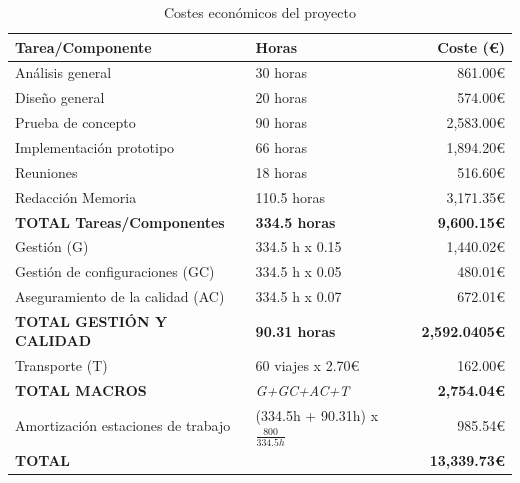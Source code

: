 \begin{table}[!h]
\centering
\bgroup
\def\arraystretch{1.3}
\begin{tabular}{l p{120pt} r}
\toprule
\textbf{Tarea/Componente} & \textbf{Horas} & \textbf{Coste (€)} \\
 \midrule
 Análisis general
& 
30 horas
& 
861.00€
 \\
 Diseño general
& 
20 horas
& 
574.00€
 \\
 Prueba de concepto
& 
90 horas
& 
2,583.00€
 \\
 Implementación prototipo
& 
66 horas
&
1,894.20€
 \\
 Reuniones
& 
18 horas
& 
516.60€
 \\
 Redacción Memoria
& 
110.5 horas
& 
3,171.35€
 \\
 \textbf{TOTAL Tareas/Componentes}
& 
\textbf{334.5 horas}
& 
\textbf{9,600.15€}
 \\
 \hline
 Gestión (G)
& 
334.5 h x 0.15
& 
1,440.02€
 \\
 Gestión de configuraciones (GC)
& 
334.5 h x 0.05
& 
480.01€
 \\
 Aseguramiento de la calidad (AC)
& 
334.5 h x 0.07
& 
672.01€
 \\
 \textbf{TOTAL GESTIÓN Y CALIDAD}
& 
\textbf{90.31 horas}
& 
\textbf{2,592.0405€}
 \\
 \hline
 Transporte (T)
& 
60 viajes x 2.70€
& 
162.00€
 \\
 \textbf{TOTAL MACROS}
& 
\textit{G+GC+AC+T}
& 
\textbf{2,754.04€}
 \\
 \hline
 Amortización estaciones de trabajo
& 
(334.5h + 90.31h) x \( \frac{800}{334.5 h} \)
& 
985.54€
 \\
 \textbf{TOTAL}
& 
& 
\textbf{13,339.73€}
 \\
\bottomrule
\end{tabular}
\egroup
\caption{Costes económicos del proyecto}
\label{tab:costeproyecto}
\end{table}
 